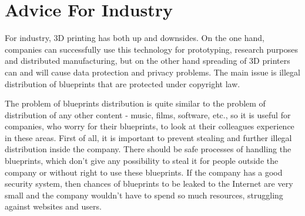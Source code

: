 \section{Advice For Industry}
For industry, 3D printing has both up and downsides.
On the one hand, companies can successfully use this technology for prototyping, research purposes and distributed manufacturing, but on the other hand spreading of 3D printers can and will cause data protection and privacy problems.
The main issue is illegal distribution of blueprints that are protected under copyright law.

The problem of blueprints distribution is quite similar to the problem of distribution of any other content - music, films, software, etc., so it is useful for companies, who worry for their blueprints, to look at their colleagues experience in these areas.
First of all, it is important to prevent stealing and further illegal distribution inside the company.
There should be safe processes of handling the blueprints, which don’t give any possibility to steal it for people outside the company or without right to use these blueprints.
If the company has a good security system, then chances of blueprints to be leaked to the Internet are very small and the company wouldn’t have to spend so much resources, struggling against websites and users.

